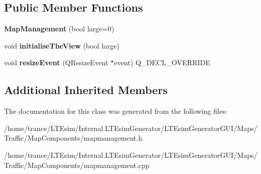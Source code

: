 \subsection*{Public Member Functions}
\begin{DoxyCompactItemize}
\item 
{\bfseries Map\+Management} (bool large=0)\hypertarget{class_map_management_a5b6a3a5b0a93c037b8dda7d0aae086d4}{}\label{class_map_management_a5b6a3a5b0a93c037b8dda7d0aae086d4}

\item 
void {\bfseries initialise\+The\+View} (bool large)\hypertarget{class_map_management_ad7d4ca263dda70f150ab1cd8fda3589f}{}\label{class_map_management_ad7d4ca263dda70f150ab1cd8fda3589f}

\item 
void {\bfseries resize\+Event} (Q\+Resize\+Event $\ast$event) Q\+\_\+\+D\+E\+C\+L\+\_\+\+O\+V\+E\+R\+R\+I\+DE\hypertarget{class_map_management_aa6bb51d109c15756f12dec5119b130fd}{}\label{class_map_management_aa6bb51d109c15756f12dec5119b130fd}

\end{DoxyCompactItemize}
\subsection*{Additional Inherited Members}


The documentation for this class was generated from the following files\+:\begin{DoxyCompactItemize}
\item 
/home/trance/\+L\+T\+Esim/\+Internal.\+L\+T\+Esim\+Generator/\+L\+T\+Esim\+Generator\+G\+U\+I/\+Maps/\+Traffic/\+Map\+Components/mapmanagement.\+h\item 
/home/trance/\+L\+T\+Esim/\+Internal.\+L\+T\+Esim\+Generator/\+L\+T\+Esim\+Generator\+G\+U\+I/\+Maps/\+Traffic/\+Map\+Components/mapmanagement.\+cpp\end{DoxyCompactItemize}

